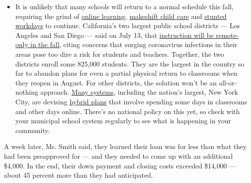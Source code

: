 \begin{itemize}
  \begin{itemize}
  \tightlist
  \item
    It is unlikely that many schools will return to a normal schedule
    this fall, requiring the grind of
    \href{https://www.nytimes3xbfgragh.onion/2020/06/05/us/coronavirus-education-lost-learning.html?action=click\&pgtype=Article\&state=default\&region=MAIN_CONTENT_3\&context=storylines_faq}{online
    learning},
    \href{https://www.nytimes3xbfgragh.onion/2020/05/29/us/coronavirus-child-care-centers.html?action=click\&pgtype=Article\&state=default\&region=MAIN_CONTENT_3\&context=storylines_faq}{makeshift
    child care} and
    \href{https://www.nytimes3xbfgragh.onion/2020/06/03/business/economy/coronavirus-working-women.html?action=click\&pgtype=Article\&state=default\&region=MAIN_CONTENT_3\&context=storylines_faq}{stunted
    workdays} to continue. California's two largest public school
    districts --- Los Angeles and San Diego --- said on July 13, that
    \href{https://www.nytimes3xbfgragh.onion/2020/07/13/us/lausd-san-diego-school-reopening.html?action=click\&pgtype=Article\&state=default\&region=MAIN_CONTENT_3\&context=storylines_faq}{instruction
    will be remote-only in the fall}, citing concerns that surging
    coronavirus infections in their areas pose too dire a risk for
    students and teachers. Together, the two districts enroll some
    825,000 students. They are the largest in the country so far to
    abandon plans for even a partial physical return to classrooms when
    they reopen in August. For other districts, the solution won't be an
    all-or-nothing approach.
    \href{https://bioethics.jhu.edu/research-and-outreach/projects/eschool-initiative/school-policy-tracker/}{Many
    systems}, including the nation's largest, New York City, are
    devising
    \href{https://www.nytimes3xbfgragh.onion/2020/06/26/us/coronavirus-schools-reopen-fall.html?action=click\&pgtype=Article\&state=default\&region=MAIN_CONTENT_3\&context=storylines_faq}{hybrid
    plans} that involve spending some days in classrooms and other days
    online. There's no national policy on this yet, so check with your
    municipal school system regularly to see what is happening in your
    community.
  \end{itemize}
\end{itemize}

A week later, Ms. Smith said, they learned their loan was for less than
what they had been preapproved for --- and they needed to come up with
an additional \$4,000. In the end, their down payment and closing costs
exceeded \$14,000 --- about 45 percent more than they had anticipated.

